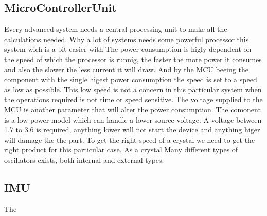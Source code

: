 \subsection{MicroControllerUnit}
Every advanced system needs a central processing unit to make all the calculations needed. Why a lot of systems needs some powerful processor this system wich is a bit easier with 
The power consumption is higly dependent on the speed of which the processor is runnig, the faster the more power it consumes and also the slower the less current it will draw. And by the MCU beeing the component with the single higest power consumption the speed is set to a speed as low as possible. This low speed is not a concern in this particular system when the operations required is not time or speed sensitive. The voltage supplied to the MCU is another parameter that will alter the power consumption. The comonent is a low power model which can handle a lower source voltage. A voltage between 1.7 to 3.6 is required, anything lower will not start the device and anything higer will damage the the part. 
To get the right speed of a crystal we need to get the right product for this particular case. As a crystal 
Many different types of oscillators exists, both internal and external types. 

\subsection{IMU}
The 
